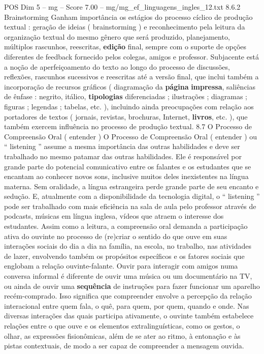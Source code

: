 \begin{textsample}{POS Dim 5 – mg – Score 7.00 – mg/mg\_ef\_linguagens\_ingles\_12.txt}  \label{ex:f5_pos_185}
8.6.2 Brainstorming Ganham importância os estágios do processo cíclico de produção textual : geração de ideias ( brainstorming ) e reconhecimento pela leitura da organização textual do mesmo gênero que será produzido, planejamento, múltiplos rascunhos, reescritas, \textbf{edição} final, sempre com o suporte de opções diferentes de feedback fornecido pelos colegas, amigos e professor.
Subjacente está a noção de aperfeiçoamento do texto ao longo do processo de discussões, reflexões, rascunhos sucessivos e reescritas até a versão final, que inclui também a incorporação de recursos gráficos ( diagramação da \textbf{página} \textbf{impressa}, saliências de ênfase : negrito, itálico, \textbf{tipologias} diferenciadas ; ilustrações ; diagramas ; figuras ; legendas ; tabelas, etc. ), incluindo ainda preocupações com relação aos portadores de textos ( jornais, revistas, brochuras, Internet, \textbf{livros}, etc. ), que também exercem influência no processo de produção textual. 8.7 O Processo de Compreensão Oral ( entender ) O Processo de Compreensão Oral ( entender ) ou “ listening ” assume a mesma importância das outras habilidades e deve ser trabalhado no mesmo patamar das outras habilidades.
Ele é responsável por grande parte do potencial comunicativo entre os falantes e os estudantes que se encantam ao conhecer novos sons, inclusive muitos deles inexistentes na língua materna.
Sem oralidade, a língua estrangeira perde grande parte de seu encanto e sedução.
E, atualmente com a disponibilidade da tecnologia digital, o “ listening ” pode ser trabalhado com mais eficiência na sala de aula pelo professor através de podcasts, músicas em língua inglesa, vídeos que atraem o interesse dos estudantes.
Assim como a leitura, a compreensão oral demanda a participação ativa do ouvinte no processo de (re)criar o sentido do que ouve em suas interações sociais do dia a dia na família, na escola, no trabalho, nas atividades de lazer, envolvendo também os propósitos específicos e os fatores sociais que englobam a relação ouvinte-falante.
Ouvir para interagir com amigos numa conversa informal é diferente de ouvir uma música ou um documentário na TV, ou ainda de ouvir uma \textbf{sequência} de instruções para fazer funcionar um aparelho recém-comprado.
Isso significa que compreender envolve a percepção da relação interacional entre quem fala, o quê, para quem, por quem, quando e onde.
Nas diversas interações das quais participa ativamente, o ouvinte também estabelece relações entre o que ouve e os elementos extralinguísticas, como os gestos, o olhar, as expressões fisionômicas, além de se ater ao ritmo, à entonação e às pistas contextuais, de modo a ser capaz de compreender a mensagem ouvida.

\end{textsample}
